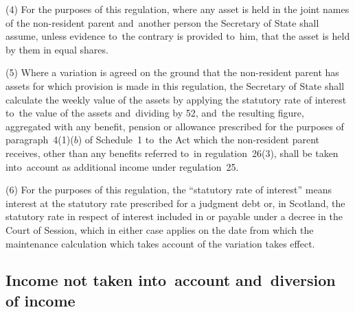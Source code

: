 \documentclass[12pt,a4paper]{article}
\begin{document}
(4) For the purposes of this regulation, where any asset is held in the joint names of the non-resident parent and~another person the Secretary of State shall assume, unless evidence to~the contrary is provided to~him, that the asset is held by them in equal shares.

(5) Where a variation is agreed on the ground that the non-resident parent has assets for which provision is made in this regulation, the Secretary of State shall calculate the weekly value of the assets by applying the statutory rate of interest to~the value of the assets and~dividing by 52, and~the resulting figure, aggregated with any benefit, pension or allowance 
prescribed for the purposes of paragraph~4(1)($b$)  of Schedule~1 to~the Act  %
which the non-resident parent receives, other than any benefits referred to~in regulation~26(3), shall be taken into~account as additional income under regulation~25.

(6) For the purposes of this regulation, the “statutory rate of interest” means interest at the statutory rate prescribed for a judgment debt or, in Scotland, the statutory rate in respect of interest included in or payable under a decree in the Court of Session, which in either case applies on the date from which the maintenance calculation which takes account of the variation takes effect.


\subsection[19. Income not taken into~account and~diversion of income]{Income not taken into~account and~diversion of income}
\end{document}
